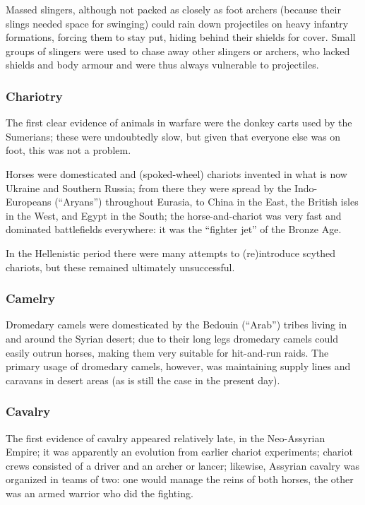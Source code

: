 \documentclass{article}
\begin{document}
Massed slingers, although not packed as closely as foot archers (because their slings needed space for swinging) could rain down projectiles on heavy infantry formations, forcing them to stay put, hiding behind their shields for cover. Small groups of slingers were used to chase away other slingers or archers, who lacked shields and body armour and were thus always vulnerable to projectiles.

\subsubsection{Chariotry}
The first clear evidence of animals in warfare were the donkey carts used by the Sumerians; these were undoubtedly slow, but given that everyone else was on foot, this was not a problem.

Horses were domesticated and (spoked-wheel) chariots invented in what is now Ukraine and Southern Russia; from there they were spread by the Indo-Europeans (``Aryans'') throughout Eurasia, to China in the East, the British isles in the West, and Egypt in the South; the horse-and-chariot was very fast and dominated battlefields everywhere: it was the ``fighter jet'' of the Bronze Age.

In the Hellenistic period there were many attempts to (re)introduce scythed chariots, but these remained ultimately unsuccessful.

\pagebreak
\subsubsection{Camelry}
Dromedary camels were domesticated by the Bedouin (``Arab'') tribes living in and around the Syrian desert; due to their long legs dromedary camels could easily outrun horses, making them very suitable for hit-and-run raids. The primary usage of dromedary camels, however, was maintaining supply lines and caravans in desert areas (as is still the case in the present day).

\subsubsection{Cavalry}
The first evidence of cavalry appeared relatively late, in the Neo-Assyrian Empire; it was apparently an evolution from earlier chariot experiments; chariot crews consisted of a driver and an archer or lancer; likewise, Assyrian cavalry was organized in teams of two: one would manage the reins of both horses, the other was an armed warrior who did the fighting.
\end{document}
